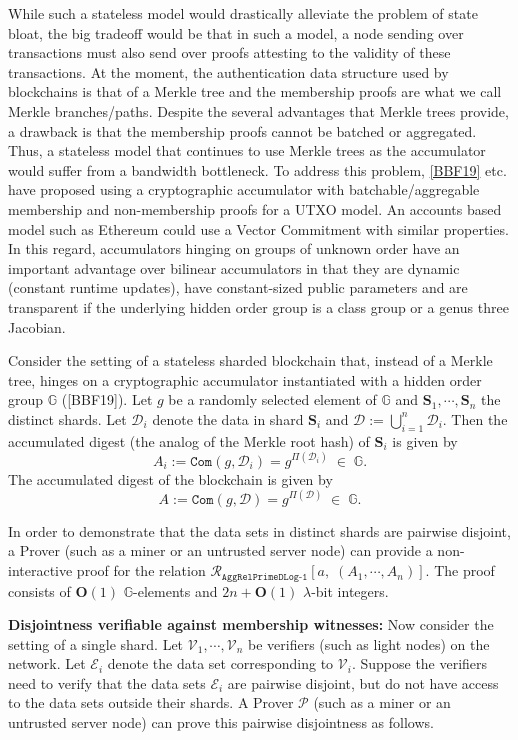 \documentclass[11pt, lettersize, notitlepage, leqno, footskip=0.6cm]{article}
\newcommand{\ttt}{\texttt}
\newcommand{\bG}{\mathbb{G}}
\newcommand{\mc}{\mathcal}
\newcommand{\mb}{\mathbb}
\newcommand{\mbf}{\mathbf}
\newcommand{\lam}{\lambda}
\newcommand{\bO}{\mbf{O}}
\newcommand{\mP}{\mc{P}}
\newcommand{\V}{\mc{V}}
\newcommand{\vs}{\vspace{-0.15cm}}
\newcommand{\noin}{\noindent}
\numberwithin{equation}{section}
\begin{document}
While such a stateless model would drastically alleviate the problem of state bloat, the big tradeoff would be that in such a model, a node sending over transactions must also send over proofs attesting to the validity of these transactions. At the moment, the authentication data structure used by blockchains is that of a Merkle tree and the membership proofs are what we call Merkle branches/paths. Despite the several advantages that Merkle trees provide, a drawback is that the membership proofs cannot be batched or aggregated. Thus, a stateless model that continues to use Merkle trees as the accumulator would suffer from a bandwidth bottleneck. To address this problem, \hyperlink{BBF19}{[BBF19]} etc. have proposed using a cryptographic accumulator with batchable/aggregable membership and non-membership proofs for a UTXO model. An accounts based model such as Ethereum could use a Vector Commitment with similar properties. In this regard, accumulators hinging on groups of unknown order have an important advantage over bilinear accumulators in that they are dynamic (constant runtime updates), have constant-sized public parameters and are transparent if the underlying hidden order group is a class group or a genus three Jacobian.

Consider the setting of a stateless sharded blockchain that, instead of a Merkle tree, hinges on a cryptographic accumulator instantiated with a hidden order group $\mb{G}$ ([BBF19]). Let $g$ be a randomly selected element of $\mb{G}$ and $\mbf{S}_1,\cdots, \mbf{S}_n$ the distinct shards. Let $\mc{D}_i$ denote the data in shard $\mbf{S}_i$ and $\mc{D}:= \bigcup\limits_{i=1}^n \mc{D}_i$. Then the accumulated digest (the analog of the Merkle root hash) of $\mbf{S}_i$ is given by \vs $$A_i:= \ttt{Com}(g, \mc{D}_i) = g^{\Pi(\mc{D}_i)}\;\in\;\bG.$$  The accumulated digest of the blockchain is given by \vs $$A:= \ttt{Com}(g, \mc{D}) = g^{\Pi(\mc{D})}\;\in\;\bG.$$

In order to demonstrate that the data sets in distinct shards are pairwise disjoint, a Prover (such as a miner or an untrusted server node) can provide a non-interactive proof for the relation \hyperlink{RP1}{$\mc{R}_{\ttt{AggRelPrimeDLog-1}}[a,\;(A_1,\cdots,A_n) ].$} The proof consists of $\bO(1)$ $\bG$-elements and $2n+\bO(1)$ $\lam$-bit integers.


\bigskip

\noin \textbf{Disjointness verifiable against membership witnesses:} Now consider the setting of a single shard. Let $\V_1,\cdots,\V_n$ be verifiers (such as light nodes) on the network. Let $\mc{E}_i$ denote the data set corresponding to $\V_i$. Suppose the verifiers need to verify that the data sets $\mc{E}_i$ are pairwise disjoint, but do not have access to the data sets outside their shards. A Prover $\mP$ (such as a miner or an untrusted server node) can prove this pairwise disjointness as follows.\vspace{0.1cm}
\end{document}
